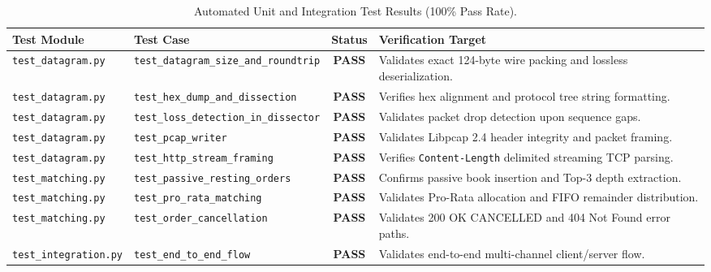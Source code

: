 \documentclass[11pt,a4paper]{article}
\begin{document}
\begin{table}[h!]
\centering
\begin{tabularx}{\textwidth}{llcX}
\toprule
\textbf{Test Module} & \textbf{Test Case} & \textbf{Status} & \textbf{Verification Target} \\
\midrule
\texttt{test\_datagram.py} & \texttt{test\_datagram\_size\_and\_roundtrip} & \textbf{PASS} & Validates exact 124-byte wire packing and lossless deserialization. \\
\texttt{test\_datagram.py} & \texttt{test\_hex\_dump\_and\_dissection} & \textbf{PASS} & Verifies hex alignment and protocol tree string formatting. \\
\texttt{test\_datagram.py} & \texttt{test\_loss\_detection\_in\_dissector} & \textbf{PASS} & Validates packet drop detection upon sequence gaps. \\
\texttt{test\_datagram.py} & \texttt{test\_pcap\_writer} & \textbf{PASS} & Validates Libpcap 2.4 header integrity and packet framing. \\
\texttt{test\_datagram.py} & \texttt{test\_http\_stream\_framing} & \textbf{PASS} & Verifies \texttt{Content-Length} delimited streaming TCP parsing. \\
\texttt{test\_matching.py} & \texttt{test\_passive\_resting\_orders} & \textbf{PASS} & Confirms passive book insertion and Top-3 depth extraction. \\
\texttt{test\_matching.py} & \texttt{test\_pro\_rata\_matching} & \textbf{PASS} & Validates Pro-Rata allocation and FIFO remainder distribution. \\
\texttt{test\_matching.py} & \texttt{test\_order\_cancellation} & \textbf{PASS} & Validates 200 OK CANCELLED and 404 Not Found error paths. \\
\texttt{test\_integration.py} & \texttt{test\_end\_to\_end\_flow} & \textbf{PASS} & Validates end-to-end multi-channel client/server flow. \\
\bottomrule
\end{tabularx}
\caption{Automated Unit and Integration Test Results (100\% Pass Rate).}
\label{tab:tests}
\end{table}
\end{document}
